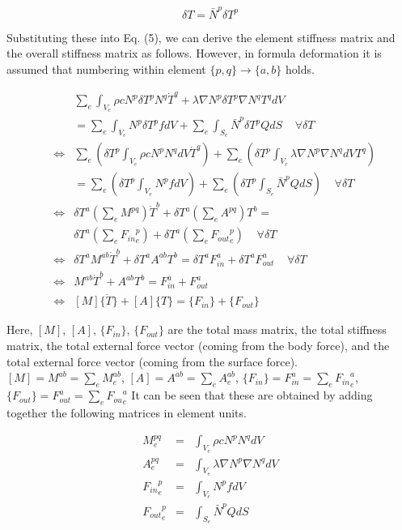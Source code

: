 \begin{equation}
\delta T = \bar{N}^p \delta T^p
\end{equation}

Substituting these into Eq. (5), we can derive the element stiffness matrix and the overall stiffness matrix as follows. However, in formula deformation it is assumed that numbering within element $\{p,q\}\rightarrow \{a,b\}$ holds.

\begin{eqnarray}
&&\sum_e\int_{V_e} \rho c N^p\delta T^pN^q\dot{T}^q  + \lambda\nabla N^p\delta T^p\nabla N^qT^qdV\\
&& = \sum_e\int_{V_e} N^p\delta T^p f dV + \sum_e\int_{S_e}  \bar{N}^p\delta T^p Q dS\;\;\;\;\forall\delta T\\      
&\Leftrightarrow& \sum_e\left(\delta T^p\int_{V_e} \rho c N^pN^q dV \dot{T}^q\right)  + \sum_e\left(\delta T^p\int_{V_e}\lambda\nabla N^p\nabla N^qdVT^q\right)\\
&&=\sum_e\left(\delta T^p\int_{V_e} N^p f dV\right) + \sum_e\left(\delta T^p \int_{S_e}  \bar{N}^pQ dS\right)\;\;\;\;\forall\delta T\\      
&\Leftrightarrow&\delta T^a\left(\sum_e M^{pq} \right)\dot{T}^b  + \delta T^a\left(\sum_eA^{pq}\right)T^b=\\
&&\delta T^a\left(\sum_e {F_{in}}^p_e \right) + \delta T^a\left(\sum_e {F_{out}}^p_e \right)\;\;\;\;\forall\delta T\\      
&\Leftrightarrow&\delta T^a M^{ab} \dot{T}^b  + \delta T^a A^{ab}T^b= \delta T^a F_{in}^a  + \delta T^a F_{out}^a \;\;\;\;\forall\delta T\\       
&\Leftrightarrow& M^{ab} \dot{T}^b  + A^{ab}T^b= F_{in}^a  + F_{out}^a\\       
&\Leftrightarrow& \left[M\right] \{\dot{T}\}  + \left[A\right]\{T\}= \{F_{in}\}  + \{F_{out}\}
\end{eqnarray}

Here, $\left[M\right]$, $\left[A\right]$, $\{F_{in}\}$, $\{F_{out}\}$ are the total mass matrix, the total stiffness matrix, the total external force vector (coming from the body force), and the total external force vector (coming from the surface force).
$\left[M\right]=M^{ab}=\sum_e M^{ab}_e$, $\left[A\right]=A^{ab}=\sum_e A^{ab}_e$, $\{F_{in}\}=F_{in}^a=\sum_e {F_{in}}^a_e$, $\{F_{out}\}=F_{out}^a=\sum_e {F_{ou}}^a_e$
It can be seen that these are obtained by adding together the following matrices in element units.


\begin{tcolorbox}[title=Element mass matrix stiffness matrix external force vector]
\begin{eqnarray}
M_e^{pq}&=&\int_{V_e} \rho c N^pN^q dV\\
A_e^{pq}&=&\int_{V_e}\lambda\nabla N^p\nabla N^qdV\\
{F_{in}}_e^p &=& \int_{V_e} N^p f dV\\
{F_{out}}_e^p &=&  \int_{S_e}  \bar{N}^pQ dS
\end{eqnarray}
\end{tcolorbox}

